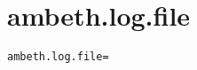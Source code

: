 \section{ambeth.log.file}
\label{configuration:AmbethLogFile}
\AvailableInCsharpOnly{\TODO}
\begin{lstlisting}[style=Props,caption={Usage example for \textit{ambeth.log.file}}]
ambeth.log.file=
\end{lstlisting}